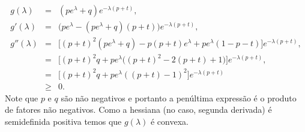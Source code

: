 \documentclass{article}
\begin{document}
\begin{equation}
	\begin{array}{rcl}
		g(\lambda) & = & (pe^{\lambda} + q)e^{-\lambda(p+t)},\\[0.75em]
		g'(\lambda) & = & \bigl(pe^{\lambda} - (pe^{\lambda}+q)(p+t)\bigr)e^{-\lambda(p+t)},\\[0.75em]
		g''(\lambda) & = & \bigl[(p+t)^2(pe^{\lambda}+q)-p(p+t)e^{\lambda}+pe^{\lambda}(1-p-t)\bigr]e^{-\lambda(p+t)},\\[0.75em]
		& = & \bigl[(p+t)^2q +pe^{\lambda}\bigl((p+t)^2 -2(p+t)+1\bigr)\bigr]e^{-\lambda(p+t)},\\[0.75em]
		& = & \bigl[(p+t)^2q +pe^{\lambda}( (p+t)-1 )^2\bigr]e^{-\lambda(p+t)}\\[0.75em]
		& \geq & 0.
	\end{array}
\end{equation}
Note que \(p\) e \(q\) são não negativos e portanto a penúltima expressão é o produto de fatores não negativos. Como a hessiana (no caso, segunda derivada) é semidefinida positiva temos que \(g(\lambda)\) é convexa.
\end{document}
